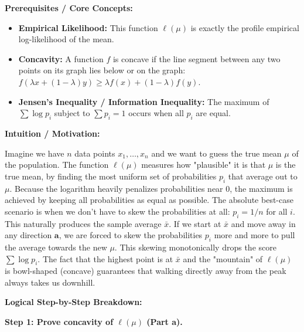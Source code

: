 \begin{solution}
\textbf{Prerequisites / Core Concepts:}
\begin{itemize}
    \item \textbf{Empirical Likelihood:} This function $\ell(\mu)$ is exactly the profile empirical log-likelihood of the mean.
    \item \textbf{Concavity:} A function $f$ is concave if the line segment between any two points on its graph lies below or on the graph: $f(\lambda x + (1-\lambda) y) \geq \lambda f(x) + (1-\lambda) f(y)$.
    \item \textbf{Jensen's Inequality / Information Inequality:} The maximum of $\sum \log p_i$ subject to $\sum p_i = 1$ occurs when all $p_i$ are equal.
\end{itemize}

\textbf{Intuition / Motivation:}

Imagine we have $n$ data points $x_1, \dots, x_n$ and we want to guess the true mean $\mu$ of the population. The function $\ell(\mu)$ measures how "plausible" it is that $\mu$ is the true mean, by finding the most uniform set of probabilities $p_i$ that average out to $\mu$.
Because the logarithm heavily penalizes probabilities near 0, the maximum is achieved by keeping all probabilities as equal as possible. The absolute best-case scenario is when we don't have to skew the probabilities at all: $p_i = 1/n$ for all $i$. This naturally produces the sample average $\bar{x}$.
If we start at $\bar{x}$ and move away in any direction $\mathbf{a}$, we are forced to skew the probabilities $p_i$ more and more to pull the average towards the new $\mu$. This skewing monotonically drops the score $\sum \log p_i$. The fact that the highest point is at $\bar{x}$ and the "mountain" of $\ell(\mu)$ is bowl-shaped (concave) guarantees that walking directly away from the peak always takes us downhill.

\textbf{Logical Step-by-Step Breakdown:}

\textbf{Step 1: Prove concavity of $\ell(\mu)$ (Part a).}


\end{solution}
